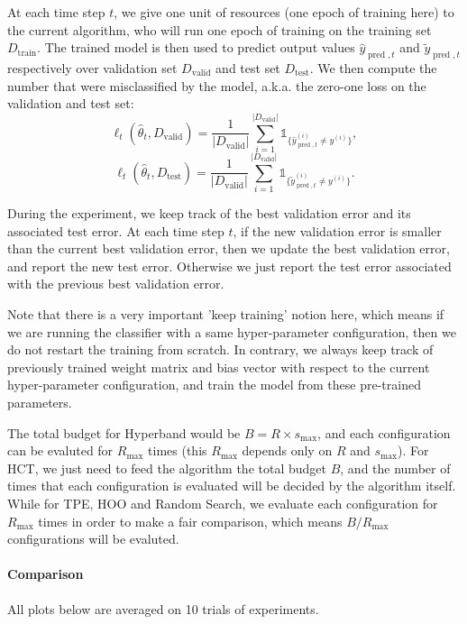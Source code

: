\documentclass[runningheads,a4paper]{llncs}
\begin{document}
At each time step $t$, we give one unit of resources (one epoch of training here) to the current algorithm, who will run one epoch of training on the training set $D_{\operatorname{train}}$. The trained model is then used to predict output values $\hat{y}_{\operatorname{pred},t}$ and $\tilde{y}_{\operatorname{pred},t}$ respectively over validation set $D_{\operatorname{valid}}$ and test set $D_{\operatorname{test}}$. We then compute the number that were misclassified by the model, a.k.a. the zero-one loss on the validation and test set:
\[
\ell_t(\hat{\theta}_t, D_{\operatorname{valid}}) = \frac{1}{|D_{\operatorname{valid}}|} \sum_{i=1}^{|D_{\operatorname{valid}}|} \mathbb{1}_{\{\hat{y}_{\operatorname{pred},t}^{(i)} \neq y^{(i)}\}},
\]
\[
\ell_t(\hat{\theta}_t, D_{\operatorname{test}}) = \frac{1}{|D_{\operatorname{valid}}|} \sum_{i=1}^{|D_{\operatorname{valid}}|} \mathbb{1}_{\{\tilde{y}_{\operatorname{pred},t}^{(i)} \neq y^{(i)}\}}.
\]

During the experiment, we keep track of the best validation error and its associated test error. At each time step $t$, if the new validation error is smaller than the current best validation error, then we update the best validation error, and report the new test error. Otherwise we just report the test error associated with the previous best validation error.

Note that there is a very important 'keep training' notion here, which means if we are running the classifier with a same hyper-parameter configuration, then we do not restart the training from scratch. In contrary, we always keep track of previously trained weight matrix and bias vector with respect to the current hyper-parameter configuration, and train the model from these pre-trained parameters. 

The total budget for Hyperband would be $B = R\times s_{\max}$, and each configuration can be evaluted for $R_{\max}$ times (this $R_{\max}$ depends only on $R$ and $s_{\max}$). For HCT, we just need to feed the algorithm the total budget $B$, and the number of times that each configuration is evaluated will be decided by the algorithm itself. While for TPE, HOO and Random Search, we  evaluate each configuration for $R_{\max}$ times in order to make a fair comparison, which means $B/R_{\max}$ configurations will be evaluted.

\paragraph{\textbf{Comparison}}
All plots below are averaged on 10 trials of experiments.
\end{document}
